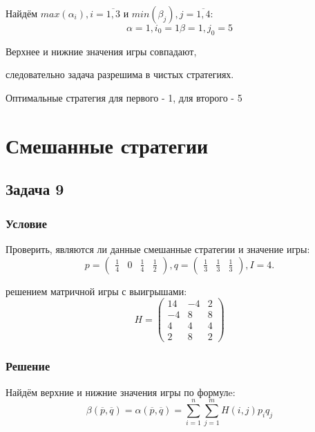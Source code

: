 \documentclass[a4paper,14pt]{extreport}
\begin{document}
Найдём $max(\alpha_i), i=\overline{1, 3}$ и $min(\beta_j), j=\overline{1, 4} $:
\begin{equation}
    \alpha = 1, i_0 = 1
    \beta = 1, j_0 = 5
\end{equation}

Верхнее и нижние значения игры совпадают, \par
следовательно задача разрешима в чистых стратегиях. \par
Оптимальные стратегия для первого - 1, для второго - 5

\chapter{Смешанные стратегии}
\section{Задача 9}
\subsection{Условие}
Проверить, являются ли данные смешанные стратегии и значение игры:
\begin{equation*}
    p = \begin{pmatrix}\frac{1}{4} & 0 & \frac{1}{4} & \frac{1}{2} \end{pmatrix}, 
    q = \begin{pmatrix}\frac{1}{3} & \frac{1}{3} & \frac{1}{3} \end{pmatrix},
    I = 4.
\end{equation*} \par
решением матричной игры с выигрышами:
\begin{equation*}
    H = \begin{pmatrix} 
            14 & -4 & 2 \\
            -4 & 8 & 8 \\
            4 & 4 & 4 \\
            2& 8 & 2
        \end{pmatrix}
\end{equation*}

\subsection{Решение}
Найдём верхние и нижние значения игры по формулe:
\begin{equation}
    \beta(\overline{p}, \overline{q}) = \alpha(\overline{p}, \overline{q}) = \sum_{i=1}^n\sum_{j=1}^mH(i,j) p_i q_j
\end{equation}
\end{document}
